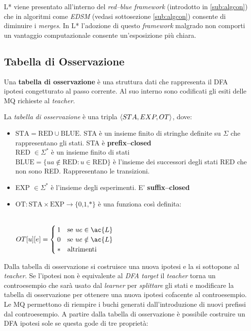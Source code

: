 L* viene presentato all'interno del \textit{red--blue framework} (introdotto in \ref{sub:algcon}) che in algoritmi come \textit{EDSM} (vedasi sottosezione \ref{sub:algcon}) consente di diminuire i \textit{merges}. In L* l'adozione di questo \textit{framework} malgrado non comporti un vantaggio computazionale consente un'esposizione più chiara.  
\subsection{Tabella di Osservazione}
\label{sub:obt}
Una \textbf{tabella di osservazione} è una struttura dati che rappresenta il DFA ipotesi congetturato al passo corrente. Al suo interno sono codificati gli esiti delle \ac{MQ} richieste al \textit{teacher}.

\begin{definizione*} La \textit{tabella di osservazione} è una tripla $\Braket{STA, EXP, OT}$, dove:
\begin{itemize}
\item $\text{STA}=\text{RED} \cup \text{BLUE}$.  STA è un insieme finito di stringhe definite su $\Sigma$ che rappresentano gli stati. STA è \textbf{prefix--closed}\\
RED $\in \Sigma^{*}$ è un insieme finito di stati\\
$\text{BLUE} = \{ua \notin \text{RED} : u \in \text{RED}\}$ è l'insieme dei successori degli stati RED che non sono RED. Rappresentano le transizioni.
\item EXP $\in \Sigma^{*}$  è l'insieme degli esperimenti. E' \textbf{suffix--closed}
\item $\text{OT} : \text{STA} \times \text{EXP} \to \text{\{0,1,*\}}$ è una funziona così definita:\\\\
\centerline{$
OT[u][e] = 
\begin{cases}
1
& \text{se $ue \in \ac{L}$} \\
0 & \text{se $ue \notin \ac{L}$}\\
* & \text{altrimenti}
\end{cases}
$}   
\end{itemize}
\end{definizione*} 
Dalla tabella di osservazione si costruisce una nuova ipotesi e la si sottopone al \textit{teacher}. Se l'ipotesi non è equivalente al \textit{DFA target} il \textit{teacher} torna un controesempio che sarà usato dal \textit{learner} per \textit{splittare} gli stati e modificare la tabella di osservazione per ottenere una nuova ipotesi cofacente al controesempio. Le \ac{MQ} permettono di riempire i buchi generati dall'introduzione di nuovi prefissi dal controesempio.  A partire dalla tabella di osservazione è possibile costruire un DFA ipotesi sole se questa gode di tre proprietà:\\

